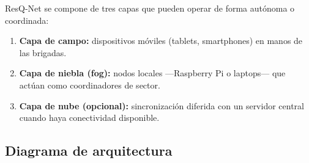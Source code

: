 \documentclass[12pt,a4paper]{article}
\begin{document}
ResQ-Net se compone de tres capas que pueden operar de forma autónoma o
coordinada:

\begin{enumerate}[leftmargin=1.5em]
  \item \textbf{Capa de campo:} dispositivos móviles (tablets, smartphones) en
        manos de las brigadas.
  \item \textbf{Capa de niebla (fog):} nodos locales ---Raspberry Pi o
        laptops--- que actúan como coordinadores de sector.
  \item \textbf{Capa de nube (opcional):} sincronización diferida con un
        servidor central cuando haya conectividad disponible.
\end{enumerate}

\subsection{Diagrama de arquitectura}
\end{document}
